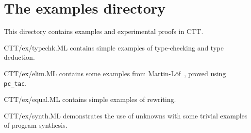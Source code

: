 \section{The examples directory}
This directory contains examples and experimental proofs in CTT.
\begin{ttdescription}
\item[CTT/ex/typechk.ML]
contains simple examples of type-checking and type deduction.

\item[CTT/ex/elim.ML]
contains some examples from Martin-L\"of~\cite{martinlof84}, proved using 
{\tt pc_tac}.

\item[CTT/ex/equal.ML]
contains simple examples of rewriting.

\item[CTT/ex/synth.ML]
demonstrates the use of unknowns with some trivial examples of program
synthesis. 
\end{ttdescription}


